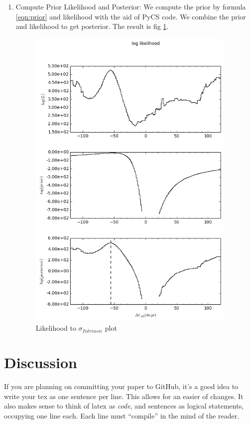 \documentclass[\docopts]{\docclass}
\begin{document}
\begin{enumerate}
\item Compute Prior Likelihood and Posterior:
We compute the prior by formula \ref{eqn:prior} and likelihood with the aid of PyCS code.  We combine the prior and likelihood to get posterior. The result is fig \ref{fig:log_data1}.
\begin{figure}[!h]
\includegraphics[width=\textwidth, height=15cm, keepaspectratio]{data1_full_log.png}
\caption{Likelihood to $\sigma_{Intrinsic}$ plot}
\label{fig:log_data1}
\end{figure}
\end{enumerate}




\section{Discussion}
\label{sec:discussion}

If you are planning on committing your paper to GitHub, it's a good idea to write your tex as one sentence per line.
This allows for an easier  of changes.
It also makes sense to think of latex as \emph{code}, and sentences as logical statements, occupying one line each.
Each line must ``compile'' in the mind of the reader.
\end{document}
